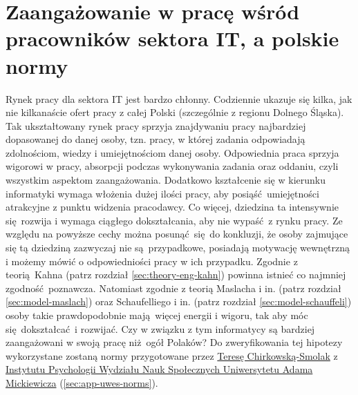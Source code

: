 \section{Zaangażowanie w pracę wśród pracowników sektora IT, a polskie normy}
Rynek pracy dla sektora IT jest bardzo chłonny. Codziennie ukazuje się kilka, jak nie kilkanaście ofert pracy z całej Polski (szczególnie z regionu Dolnego Śląska). Tak ukształtowany rynek pracy sprzyja znajdywaniu pracy najbardziej dopasowanej do danej osoby, tzn. pracy, w której zadania odpowiadają zdolnościom, wiedzy i umiejętnościom danej osoby. Odpowiednia praca sprzyja wigorowi w pracy, absorpcji podczas wykonywania zadania oraz oddaniu, czyli wszystkim aspektom zaangażowania. Dodatkowo kształcenie
się w kierunku informatyki wymaga włożenia dużej ilości pracy, aby posiąść umiejętności atrakcyjne z punktu widzenia pracodawcy. Co więcej, dziedzina ta intensywnie się rozwija i wymaga ciągłego dokształcania, aby nie wypaść z rynku pracy. Ze względu na powyższe cechy można posunąć się do konkluzji, że osoby zajmujące się tą dziedziną zazwyczaj nie są przypadkowe, posiadają motywację wewnętrzną i możemy mówić o odpowiedniości pracy w ich przypadku. Zgodnie z teorią Kahna (patrz
rozdział \ref{sec:theory-eng-kahn}) powinna istnieć co najmniej zgodność poznawcza. Natomiast zgodnie z teorią Maslacha i in. (patrz rozdział \ref{sec:model-maslach}) oraz Schaufelliego i in. (patrz rozdział \ref{sec:model-schauffeli}) osoby takie prawdopodobnie mają więcej energii i wigoru, tak aby móc się dokształcać i rozwijać. Czy w związku z tym informatycy są bardziej zaangażowani w swoją pracę
niż ogół Polaków? Do zweryfikowania tej hipotezy wykorzystane zostaną normy przygotowane przez \href{http://www.psychologia.amu.edu.pl/ip-uam/struktura-zatrudnienia-w-instytucie/curriculum-vitae-teresa-chirkowska-smolak/}{Teresę Chirkowską-Smolak} z \href{http://www.psychologia.amu.edu.pl/}{Instytutu Psychologii Wydziału Nauk Społecznych Uniwersytetu Adama Mickiewicza} (\ref{sec:app-uwes-norms}). 
